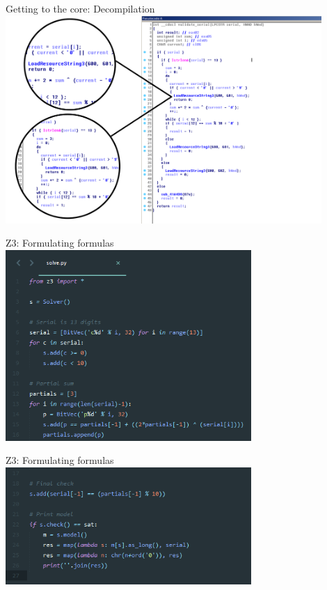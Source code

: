 \documentclass[10pt, compress, aspectratio=169]{beamer}
\begin{document}
\begin{frame}{Getting to the core: Decompilation}
	\includegraphics[width=0.9\textwidth]{images/sc1-4-validator-rev-zoom.png}
\end{frame}

\begin{frame}{Z3: Formulating formulas}
	\includegraphics[width=0.7\textwidth]{images/sc1-6-z3-1.png}
\end{frame}

\begin{frame}{Z3: Formulating formulas}
	\includegraphics[width=0.7\textwidth]{images/sc1-6-z3-2.png}
\end{frame}
\end{document}
